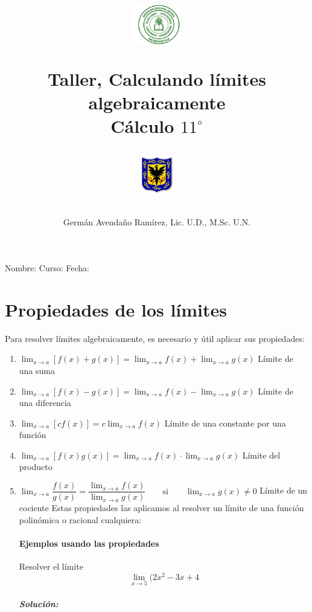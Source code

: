 \documentclass[10pt,twoside]{article}
\author{Germ\'an Avenda\~no Ram\'irez, Lic. U.D., M.Sc. U.N.}
\title{\begin{minipage}{.2\textwidth}
\includegraphics[height=1.75cm]{Images/logo-colegio.png}\end{minipage}
\begin{minipage}{.55\textwidth}
\begin{center}
Taller, Calculando límites algebraicamente\\
Cálculo $11^{\circ}$
\end{center}
\end{minipage}\hfill
\begin{minipage}{.2\textwidth}
\includegraphics[height=1.75cm]{Images/logo-sed.png} 
\end{minipage}}
\date{}
\begin{document}
\maketitle
Nombre: \hrulefill Curso: \underline{\hspace*{44pt}} Fecha: \underline{\hspace*{2.5cm}}
\section*{Propiedades de los l\'{i}mites}
Para resolver l\'{i}mites algebraicamente, es necesario y \'{u}til aplicar sus propiedades:
\begin{enumerate}
\item $\displaystyle{\lim_{x \rightarrow a}[f(x)+g(x)]=\lim_{x \rightarrow a}f(x)+\lim_{x\rightarrow a}g(x)}$ \hfill Límite de una suma
\item $\displaystyle{\lim_{x\rightarrow a}[f(x)-g(x)]=\lim_{x\rightarrow a}f(x)-\lim_{x\rightarrow a}g(x)}$ \hfill Límite de una diferencia
\item $\displaystyle{\lim_{x\rightarrow a}[cf(x)]=c\lim_{x\rightarrow a}f(x)}$ \hfill Límite de una constante por una función
\item $\displaystyle{\lim_{x\rightarrow a}[f(x)g(x)]=\lim_{x\rightarrow a}f(x)\cdot \lim_{x\rightarrow a}g(x)}$ \hfill Límite del producto
\item $\displaystyle{\lim_{x\rightarrow a}\dfrac{f(x)}{g(x)}}=\dfrac{\displaystyle{\lim_{x\rightarrow a}}f(x)}{\displaystyle{\lim_{x\rightarrow a}}g(x)} \qquad \text{si} \qquad \displaystyle{\lim_{x\rightarrow a}g(x)\neq 0}$ \hfill Límite de un cociente
Estas propiedades las aplicamos al resolver un límite de una función polinómica o racional cualquiera:
\paragraph*{Ejemplos usando las propiedades} Resolver el límite 
\[\displaystyle{\lim_{x\rightarrow 5}}(2x^{2}-3x+4\]
\subparagraph*{Solución:}
\end{enumerate}
\end{document}
